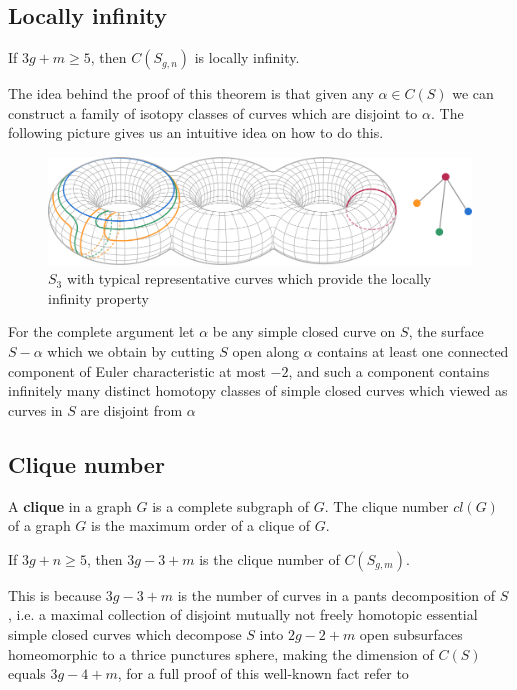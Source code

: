 \subsection{Locally infinity}
\begin{theorem}
If $3g+m\geq 5$, then $C(S_{g,n})$ is locally infinity.
\end{theorem}
The idea behind the proof of this theorem is that given any $\alpha \in C(S)$ we can construct a family of isotopy classes of curves which are disjoint to $\alpha$. The following picture gives us an intuitive idea on how to do this.
\vspace{1cm}
\begin{figure}[h!]
	\centering
	\includegraphics[scale=0.5]{Figures/Locally-infinite.png}
	\caption{$S_{3}$ with typical representative curves which provide the locally infinity property}
\end{figure}

For the complete argument let $\alpha$ be any simple closed curve on $S$, the surface $S-\alpha$ which we obtain by cutting $S$ open along $\alpha$ contains at least one connected component of Euler characteristic at most $-2$, and such a component contains infinitely many distinct homotopy classes of simple closed curves which viewed as curves in $S$ are disjoint from $\alpha$ 

\subsection{Clique number}
A \textbf{clique} in a graph $G$ is a complete subgraph of $G$. The clique number $cl(G)$ of a graph $G$ is the maximum order of a clique of $G$.

\begin{theorem}
If $3g+n\geq 5$, then $3g - 3 + m$ is the clique number of $C(S_{g,m})$.
\end{theorem}

 This is because $3g-3+m$ is the number of curves in a pants decomposition of $S$, i.e. a maximal collection of disjoint mutually not freely homotopic essential simple closed curves which decompose $S$ into $2g-2+m$ open subsurfaces homeomorphic to a thrice punctures sphere, making the dimension of $C(S)$ equals $3g-4+m$, for a full proof of this well-known fact refer to \cite[Hatcher]{Pants}
 
